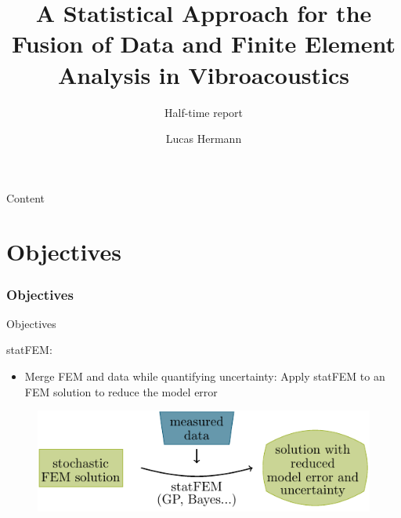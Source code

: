 \documentclass[fleqn,11pt,aspectratio=43]{beamer}
\title{A Statistical Approach for the Fusion of
Data and Finite Element Analysis in
Vibroacoustics}
\subtitle{Half-time report}
\author{Lucas Hermann}
\begin{document}
\begin{frame}[plain]
\titlepage
\end{frame}
\begin{frame}{Content}
\tableofcontents[part=1]

\tableofcontents[part=2]

\tableofcontents[part=3]
\end{frame}
\part{Objectives}

\begin{frame}[plain]
  \partpage
\end{frame}


\section{Objectives}



\begin{frame}{Objectives}

statFEM:
\begin{itemize}
  \item Merge FEM and data while quantifying uncertainty:
   Apply statFEM to an FEM solution to reduce the model error
      
 
\end{itemize}

\begin{figure}[h]
\begin{center}
\includegraphics[scale=1]{intro}
\end{center}
\end{figure}

\end{frame}
\end{document}
